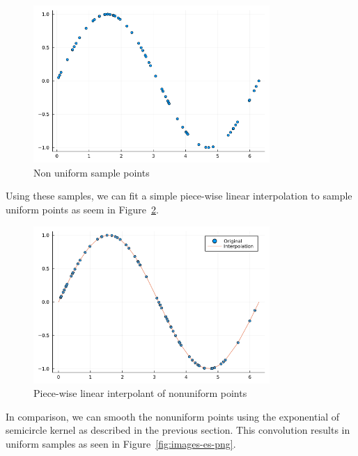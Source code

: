 \begin{figure}[htpb]
    \centering
    \includegraphics[width=0.8\textwidth]{images/nu_points.png}
    \caption{Non uniform sample points}
    \label{fig:nu_points}
\end{figure}

Using these samples, we can fit a simple piece-wise linear interpolation to sample uniform points as seem in Figure~\ref{fig:images-interp-png}.

\begin{figure}[htpb]
    \centering
    \includegraphics[width=0.8\textwidth]{images/interp.png}
    \caption{Piece-wise linear interpolant of nonuniform points}
    \label{fig:images-interp-png}
\end{figure}

In comparison, we can smooth the nonuniform points using the exponential of semicircle kernel as described in the previous section.
This convolution results in uniform samples as seen in Figure~\ref{fig:images-es-png}.

